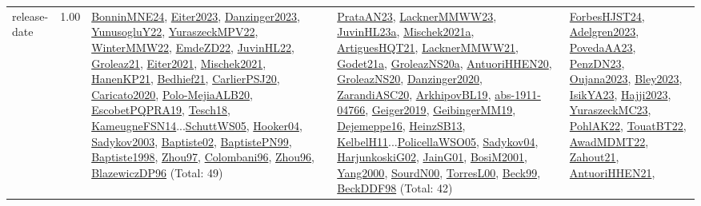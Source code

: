 {\begin{longtable}{p{3cm}r>{\raggedright\arraybackslash}p{6cm}>{\raggedright\arraybackslash}p{6cm}>{\raggedright\arraybackslash}p{8cm}}
\index{release-date}\index{Concepts!release-date}release-date &  1.00 & \hyperref[detail:BonninMNE24]{BonninMNE24}, \hyperref[detail:Eiter2023]{Eiter2023}, \hyperref[detail:Danzinger2023]{Danzinger2023}, \hyperref[detail:YunusogluY22]{YunusogluY22}, \hyperref[detail:YuraszeckMPV22]{YuraszeckMPV22}, \hyperref[detail:WinterMMW22]{WinterMMW22}, \hyperref[detail:EmdeZD22]{EmdeZD22}, \hyperref[detail:JuvinHL22]{JuvinHL22}, \hyperref[detail:Groleaz21]{Groleaz21}, \hyperref[detail:Eiter2021]{Eiter2021}, \hyperref[detail:Mischek2021]{Mischek2021}, \hyperref[detail:HanenKP21]{HanenKP21}, \hyperref[detail:Bedhief21]{Bedhief21}, \hyperref[detail:CarlierPSJ20]{CarlierPSJ20}, \hyperref[detail:Caricato2020]{Caricato2020}, \hyperref[detail:Polo-MejiaALB20]{Polo-MejiaALB20}, \hyperref[detail:EscobetPQPRA19]{EscobetPQPRA19}, \hyperref[detail:Tesch18]{Tesch18}, \hyperref[detail:KameugneFSN14]{KameugneFSN14}...\hyperref[detail:SchuttWS05]{SchuttWS05}, \hyperref[detail:Hooker04]{Hooker04}, \hyperref[detail:Sadykov2003]{Sadykov2003}, \hyperref[detail:Baptiste02]{Baptiste02}, \hyperref[detail:BaptistePN99]{BaptistePN99}, \hyperref[detail:Baptiste1998]{Baptiste1998}, \hyperref[detail:Zhou97]{Zhou97}, \hyperref[detail:Colombani96]{Colombani96}, \hyperref[detail:Zhou96]{Zhou96}, \hyperref[detail:BlazewiczDP96]{BlazewiczDP96} (Total: 49) & \hyperref[detail:PrataAN23]{PrataAN23}, \hyperref[detail:LacknerMMWW23]{LacknerMMWW23}, \hyperref[detail:JuvinHL23a]{JuvinHL23a}, \hyperref[detail:Mischek2021a]{Mischek2021a}, \hyperref[detail:ArtiguesHQT21]{ArtiguesHQT21}, \hyperref[detail:LacknerMMWW21]{LacknerMMWW21}, \hyperref[detail:Godet21a]{Godet21a}, \hyperref[detail:GroleazNS20a]{GroleazNS20a}, \hyperref[detail:AntuoriHHEN20]{AntuoriHHEN20}, \hyperref[detail:GroleazNS20]{GroleazNS20}, \hyperref[detail:Danzinger2020]{Danzinger2020}, \hyperref[detail:ZarandiASC20]{ZarandiASC20}, \hyperref[detail:ArkhipovBL19]{ArkhipovBL19}, \hyperref[detail:abs-1911-04766]{abs-1911-04766}, \hyperref[detail:Geiger2019]{Geiger2019}, \hyperref[detail:GeibingerMM19]{GeibingerMM19}, \hyperref[detail:Dejemeppe16]{Dejemeppe16}, \hyperref[detail:HeinzSB13]{HeinzSB13}, \hyperref[detail:KelbelH11]{KelbelH11}...\hyperref[detail:PolicellaWSO05]{PolicellaWSO05}, \hyperref[detail:Sadykov04]{Sadykov04}, \hyperref[detail:HarjunkoskiG02]{HarjunkoskiG02}, \hyperref[detail:JainG01]{JainG01}, \hyperref[detail:BosiM2001]{BosiM2001}, \hyperref[detail:Yang2000]{Yang2000}, \hyperref[detail:SourdN00]{SourdN00}, \hyperref[detail:TorresL00]{TorresL00}, \hyperref[detail:Beck99]{Beck99}, \hyperref[detail:BeckDDF98]{BeckDDF98} (Total: 42) & \hyperref[detail:ForbesHJST24]{ForbesHJST24}, \hyperref[detail:Adelgren2023]{Adelgren2023}, \hyperref[detail:PovedaAA23]{PovedaAA23}, \hyperref[detail:PenzDN23]{PenzDN23}, \hyperref[detail:Oujana2023]{Oujana2023}, \hyperref[detail:Bley2023]{Bley2023}, \hyperref[detail:IsikYA23]{IsikYA23}, \hyperref[detail:Hajji2023]{Hajji2023}, \hyperref[detail:YuraszeckMC23]{YuraszeckMC23}, \hyperref[detail:PohlAK22]{PohlAK22}, \hyperref[detail:TouatBT22]{TouatBT22}, \hyperref[detail:AwadMDMT22]{AwadMDMT22}, \hyperref[detail:Zahout21]{Zahout21}, \hyperref[detail:AntuoriHHEN21]{AntuoriHHEN21}, 
\end{longtable}}
